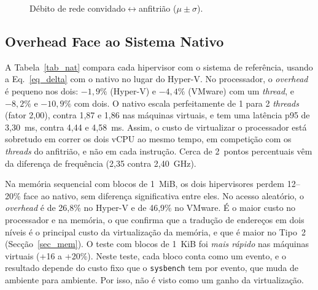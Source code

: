 \documentclass[conference]{IEEEtran}
\begin{document}
\begin{figure}[t]
\centering
{}
\caption{Débito de rede convidado$\leftrightarrow$anfitrião ($\mu\pm\sigma$).}
\label{fig_rede}
\end{figure}

\subsection{Overhead Face ao Sistema Nativo}\label{sec_nat}
A Tabela~\ref{tab_nat} compara cada hipervisor com o sistema de referência, usando a Eq.~\eqref{eq_delta} com o nativo no lugar do Hyper-V. No processador, o \textit{overhead} é pequeno nos dois: $-1{,}9\%$ (Hyper-V) e $-4{,}4\%$ (VMware) com um \textit{thread}, e $-8{,}2\%$ e $-10{,}9\%$ com dois. O nativo escala perfeitamente de 1 para 2 \textit{threads} (fator 2,00), contra 1,87 e 1,86 nas máquinas virtuais, e tem uma latência p95 de 3,30~ms, contra 4,44 e 4,58~ms. Assim, o custo de virtualizar o processador está sobretudo em correr os dois vCPU ao mesmo tempo, em competição com os \textit{threads} do anfitrião, e não em cada instrução. Cerca de 2~pontos percentuais vêm da diferença de frequência (2,35 contra 2,40~GHz).

Na memória sequencial com blocos de 1~MiB, os dois hipervisores perdem 12--20\% face ao nativo, sem diferença significativa entre eles. No acesso aleatório, o \textit{overhead} é de 26,8\% no Hyper-V e de 46,9\% no VMware. É o maior custo no processador e na memória, o que confirma que a tradução de endereços em dois níveis é o principal custo da virtualização da memória, e que é maior no Tipo~2 (Secção~\ref{sec_mem}). O teste com blocos de 1~KiB foi \textit{mais rápido} nas máquinas virtuais (+16 a +20\%). Neste teste, cada bloco conta como um evento, e o resultado depende do custo fixo que o \texttt{sysbench} tem por evento, que muda de ambiente para ambiente. Por isso, não é visto como um ganho da virtualização.
\end{document}
